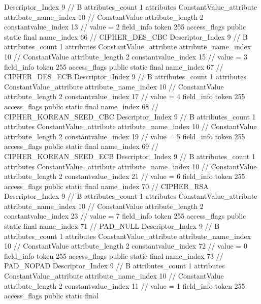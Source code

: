 {{{{{				Descriptor_Index	9		// B
				attributes_count	1
				attributes {
				ConstantValue_attribute {
					attribute_name_index	10		// ConstantValue
					attribute_length	2
					constantvalue_index	13		// value = 2
				}
				}
			}
			field_info {
				token	255
				access_flags	public static final
				name_index	66		// CIPHER_DES_CBC
				Descriptor_Index	9		// B
				attributes_count	1
				attributes {
				ConstantValue_attribute {
					attribute_name_index	10		// ConstantValue
					attribute_length	2
					constantvalue_index	15		// value = 3
				}
				}
			}
			field_info {
				token	255
				access_flags	public static final
				name_index	67		// CIPHER_DES_ECB
				Descriptor_Index	9		// B
				attributes_count	1
				attributes {
				ConstantValue_attribute {
					attribute_name_index	10		// ConstantValue
					attribute_length	2
					constantvalue_index	17		// value = 4
				}
				}
			}
			field_info {
				token	255
				access_flags	public static final
				name_index	68		// CIPHER_KOREAN_SEED_CBC
				Descriptor_Index	9		// B
				attributes_count	1
				attributes {
				ConstantValue_attribute {
					attribute_name_index	10		// ConstantValue
					attribute_length	2
					constantvalue_index	19		// value = 5
				}
				}
			}
			field_info {
				token	255
				access_flags	public static final
				name_index	69		// CIPHER_KOREAN_SEED_ECB
				Descriptor_Index	9		// B
				attributes_count	1
				attributes {
				ConstantValue_attribute {
					attribute_name_index	10		// ConstantValue
					attribute_length	2
					constantvalue_index	21		// value = 6
				}
				}
			}
			field_info {
				token	255
				access_flags	public static final
				name_index	70		// CIPHER_RSA
				Descriptor_Index	9		// B
				attributes_count	1
				attributes {
				ConstantValue_attribute {
					attribute_name_index	10		// ConstantValue
					attribute_length	2
					constantvalue_index	23		// value = 7
				}
				}
			}
			field_info {
				token	255
				access_flags	public static final
				name_index	71		// PAD_NULL
				Descriptor_Index	9		// B
				attributes_count	1
				attributes {
				ConstantValue_attribute {
					attribute_name_index	10		// ConstantValue
					attribute_length	2
					constantvalue_index	72		// value = 0
				}
				}
			}
			field_info {
				token	255
				access_flags	public static final
				name_index	73		// PAD_NOPAD
				Descriptor_Index	9		// B
				attributes_count	1
				attributes {
				ConstantValue_attribute {
					attribute_name_index	10		// ConstantValue
					attribute_length	2
					constantvalue_index	11		// value = 1
				}
				}
			}
			field_info {
				token	255
				access_flags	public static final
}}}}}
